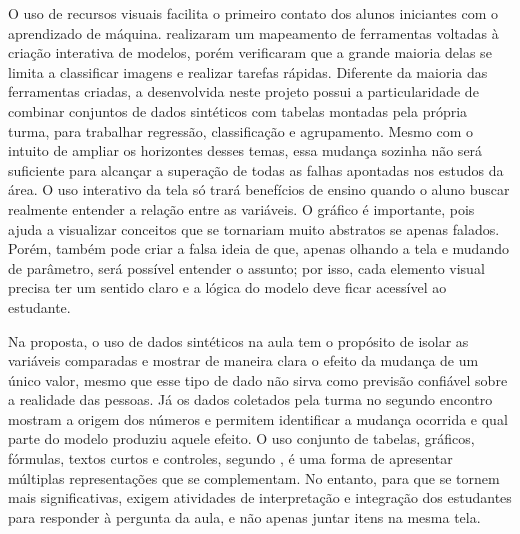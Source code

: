 O uso de recursos visuais facilita o primeiro contato dos alunos iniciantes com o aprendizado de máquina.  realizaram um mapeamento de ferramentas voltadas à criação interativa de modelos, porém verificaram que a grande maioria delas se limita a classificar imagens e realizar tarefas rápidas. Diferente da maioria das ferramentas criadas, a desenvolvida neste projeto possui a particularidade de combinar conjuntos de dados sintéticos com tabelas montadas pela própria turma, para trabalhar regressão, classificação e agrupamento. Mesmo com o intuito de ampliar os horizontes desses temas, essa mudança sozinha não será suficiente para alcançar a superação de todas as falhas apontadas nos estudos da área. O uso interativo da tela só trará benefícios de ensino quando o aluno buscar realmente entender a relação entre as variáveis. O gráfico é importante, pois ajuda a visualizar conceitos que se tornariam muito abstratos se apenas falados. Porém, também pode criar a falsa ideia de que, apenas olhando a tela e mudando de parâmetro, será possível entender o assunto; por isso, cada elemento visual precisa ter um sentido claro e a lógica do modelo deve ficar acessível ao estudante.

Na proposta, o uso de dados sintéticos na aula tem o propósito de isolar as variáveis comparadas e mostrar de maneira clara o efeito da mudança de um único valor, mesmo que esse tipo de dado não sirva como previsão confiável sobre a realidade das pessoas. Já os dados coletados pela turma no segundo encontro mostram a origem dos números e permitem identificar a mudança ocorrida e qual parte do modelo produziu aquele efeito. O uso conjunto de tabelas, gráficos, fórmulas, textos curtos e controles, segundo , é uma forma de apresentar múltiplas representações que se complementam. No entanto, para que se tornem mais significativas, exigem atividades de interpretação e integração dos estudantes para responder à pergunta da aula, e não apenas juntar itens na mesma tela.

